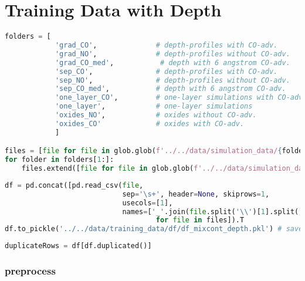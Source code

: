 \hypertarget{training-data-with-depth}{%
\section*{Training Data with Depth}\label{training-data-with-depth}}

\begin{lstlisting}[language=Python]
folders = [
            'grad_CO',              # depth-profiles with CO-adv.       with gradient layers
            'grad_NO',              # depth-profiles without CO-adv.    with gradient layers
            'grad_CO_med',           # depth with 6 angstrom CO-adv.       with gradient layers
            'sep_CO',               # depth-profiles with CO-adv.       with separated layers
            'sep_NO',               # depth-profiles without CO-adv.    with separated layers
            'sep_CO_med',           # depth with 6 angstrom CO-adv.       with separated layers
            'one_layer_CO',         # one-layer simulations with CO-adv.
            'one_layer',            # one-layer simulations
            'oxides_NO',            # oxides without CO-adv.
            'oxides_CO'             # oxides with CO-adv.
            ]

files = [file for file in glob.glob(f'../../data/simulation_data/{folders[0]}/*.spc')]
for folder in folders[1:]:
    files.extend([file for file in glob.glob(f'../../data/simulation_data/{folder}/*.spc')])
\end{lstlisting}

\begin{lstlisting}[language=Python]
df = pd.concat([pd.read_csv(file,
                            sep='\s+', header=None, skiprows=1,
                            usecols=[1],
                            names=['_'.join(file.split('\\')[1].split('_')[:-1])]).T 
                                    for file in files]).T
df.to_pickle('../../data/training_data/df/df_mixcont_depth.pkl') # save the df without preprocessing
\end{lstlisting}

\begin{lstlisting}[language=Python]
duplicateRows = df[df.duplicated()]
\end{lstlisting}

\hypertarget{preprocess}{%
\subsubsection*{preprocess}\label{preprocess}}

